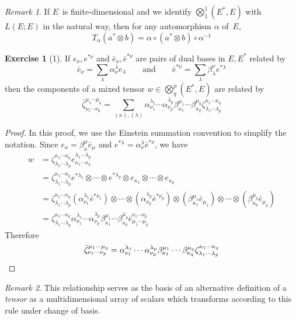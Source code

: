 \documentclass[letterpaper,12pt]{article}
\newcommand{\after}{\circ}
\newcommand{\tprod}{\otimes}
\newcommand{\bigtprod}{\bigotimes}
\newcommand{\medtprod}{{\textstyle\bigtprod}}
\theoremstyle{definition}
\newtheorem*{exer}{Exercise}
\theoremstyle{remark}
\newtheorem*{rmk}{Remark}
\begin{document}
\begin{rmk}
If \(E\)~is finite-dimensional and we identify \(\medtprod^1_1(E^*,E)\) with \(L(E;E)\) in the natural way, then for any automorphism \(\alpha\) of~\(E\),
\[T_{\alpha}(a^*\tprod b)=\alpha\after(a^*\tprod b)\after\alpha^{-1}\]
\end{rmk}

\begin{exer}[1]
If \(e_{\nu},e^{*\nu}\) and \(\bar{e}_{\nu},\bar{e}^{*\nu}\) are pairs of dual bases in \(E,E^*\) related by
\[\bar{e}_{\nu}=\sum_{\lambda}\alpha_{\nu}^{\lambda}e_{\lambda}\qquad\text{and}\qquad\bar{e}^{*\nu}=\sum_{\lambda}\beta^{\nu}_{\lambda}e^{*\lambda}\]
then the components of a mixed tensor \(w\in\medtprod^p_q(E^*,E)\) are related by
\[\bar{\zeta}^{\mu_1\cdots\mu_q}_{\nu_1\cdots\nu_p}=\sum_{(\kappa),(\lambda)}\alpha_{\nu_1}^{\lambda_1}\cdots\alpha_{\nu_p}^{\lambda_p}\beta^{\mu_1}_{\kappa_1}\cdots\beta^{\mu_q}_{\kappa_q}\zeta^{\kappa_1\cdots\kappa_q}_{\lambda_1\cdots\lambda_p}\]
\end{exer}
\begin{proof}
In this proof, we use the Einstein summation convention to simplify the notation. Since \(e_{\kappa}=\beta_{\kappa}^{\mu}\bar{e}_{\mu}\) and \(e^{*\lambda}=\alpha^{\lambda}_{\nu}\bar{e}^{*\nu}\), we have
\begin{align*}
w&=\zeta^{\kappa_1\cdots\kappa_q}_{\lambda_1\cdots\lambda_p}e^{\lambda_1\cdots\lambda_p}_{\kappa_1\cdots\kappa_q}\\
	&=\zeta^{\kappa_1\cdots\kappa_q}_{\lambda_1\cdots\lambda_p}e^{*\lambda_1}\tprod\cdots\tprod e^{*\lambda_p}\tprod e_{\kappa_1}\tprod\cdots\tprod e_{\kappa_q}\\
	&=\zeta^{\kappa_1\cdots\kappa_q}_{\lambda_1\cdots\lambda_p}(\alpha^{\lambda_1}_{\nu_1}\bar{e}^{*\nu_1})\tprod\cdots\tprod(\alpha^{\lambda_p}_{\nu_p}\bar{e}^{*\nu_p})\tprod(\beta_{\kappa_1}^{\mu_1}\bar{e}_{\mu_1})\tprod\cdots\tprod(\beta_{\kappa_q}^{\mu_q}\bar{e}_{\mu_q})\\
	&=\zeta^{\kappa_1\cdots\kappa_q}_{\lambda_1\cdots\lambda_p}\alpha^{\lambda_1}_{\nu_1}\cdots\alpha^{\lambda_p}_{\nu_p}\beta_{\kappa_1}^{\mu_1}\cdots\beta_{\kappa_q}^{\mu_q}\bar{e}^{\nu_1\cdots\nu_p}_{\mu_1\cdots\mu_q}
\end{align*}
Therefore
\[\bar{\zeta}^{\mu_1\cdots\mu_q}_{\nu_1\cdots\nu_p}=\alpha_{\nu_1}^{\lambda_1}\cdots\alpha_{\nu_p}^{\lambda_p}\beta^{\mu_1}_{\kappa_1}\cdots\beta^{\mu_q}_{\kappa_q}\zeta^{\kappa_1\cdots\kappa_q}_{\lambda_1\cdots\lambda_p}\qedhere\]
\end{proof}
\begin{rmk}
This relationship serves as the basis of an alternative definition of a \emph{tensor} as a multidimensional array of scalars which transforms according to this rule under change of basis.
\end{rmk}
\end{document}
